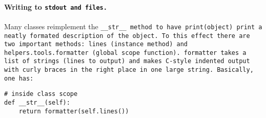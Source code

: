 \documentclass{article}
\begin{document}
\paragraph{Writing to \tt{stdout} and files.}Many classes reimplement the \tt{\_\_str\_\_} method to have \tt{print(object)} print a neatly formated description of the object. To this effect there are two important methods: \tt{lines} (instance method) and \tt{helpers.tools.formatter} (global scope function). \tt{formatter} takes a list of strings (lines to output) and makes C-style indented output with curly braces in the right place in one large string. Basically, one has:

\begin{lstlisting}
# inside class scope
def __str__(self):
	return formatter(self.lines())
	
\end{lstlisting}
\end{document}
